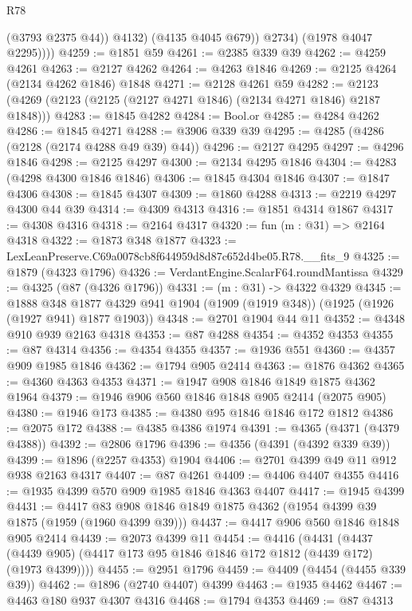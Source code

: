\begin{lexlean}{R78}
\begin{coremodule}
                  (@3793 @2375 @44))
                @4132)
              (@4135 @4045 @679))
            @2734)
          (@1978 @4047 @2295))))
@4259 := @1851 @59
@4261 := @2385 @339 @39
@4262 := @4259 @4261
@4263 := @2127 @4262
@4264 := @4263 @1846
@4269 := @2125 @4264 (@2134 @4262 @1846) @1848
@4271 := @2128 @4261 @59
@4282 := @2123 (@4269 (@2123 (@2125 (@2127 @4271 @1846) (@2134 @4271 @1846) @2187 @1848)))
@4283 := @1845 @4282
@4284 := Bool.or
@4285 := @4284 @4262
@4286 := @1845 @4271
@4288 := @3906 @339 @39
@4295 := @4285 (@4286 (@2128 (@2174 @4288 @49 @39) @44))
@4296 := @2127 @4295
@4297 := @4296 @1846
@4298 := @2125 @4297
@4300 := @2134 @4295 @1846
@4304 := @4283 (@4298 @4300 @1846 @1846)
@4306 := @1845 @4304 @1846
@4307 := @1847 @4306
@4308 := @1845 @4307
@4309 := @1860 @4288
@4313 := @2219 @4297 @4300 @44 @39
@4314 := @4309 @4313
@4316 := @1851 @4314 @1867
@4317 := @4308 @4316
@4318 := @2164 @4317
@4320 := fun (m : @31) => @2164 @4318
@4322 := @1873 @348 @1877
@4323 := LexLeanPreserve.C69a0078cb8f644959d8d87c652d4be05.R78.__fits_9
@4325 := @1879 (@4323 @1796)
@4326 := VerdantEngine.ScalarF64.roundMantissa
@4329 := @4325 (@87 (@4326 @1796))
@4331 := (m : @31) -> @4322 @4329
@4345 := @1888
    @348
    @1877
    @4329
    @941
    @1904
    (@1909 (@1919 @348))
    (@1925 (@1926 (@1927 @941) @1877 @1903))
@4348 := @2701 @1904 @44 @11
@4352 := @4348 @910 @939 @2163 @4318
@4353 := @87 @4288
@4354 := @4352 @4353
@4355 := @87 @4314
@4356 := @4354 @4355
@4357 := @1936 @551
@4360 := @4357 @909 @1985 @1846
@4362 := @1794 @905 @2414
@4363 := @1876 @4362
@4365 := @4360 @4363 @4353
@4371 := @1947 @908 @1846 @1849 @1875 @4362 @1964
@4379 := @1946 @906 @560 @1846 @1848 @905 @2414 (@2075 @905)
@4380 := @1946 @173
@4385 := @4380 @95 @1846 @1846 @172 @1812
@4386 := @2075 @172
@4388 := @4385 @4386 @1974
@4391 := @4365 (@4371 (@4379 @4388))
@4392 := @2806 @1796
@4396 := @4356 (@4391 (@4392 @339 @39))
@4399 := @1896 (@2257 @4353) @1904
@4406 := @2701 @4399 @49 @11 @912 @938 @2163 @4317
@4407 := @87 @4261
@4409 := @4406 @4407 @4355
@4416 := @1935 @4399 @570 @909 @1985 @1846 @4363 @4407
@4417 := @1945 @4399
@4431 := @4417 @83 @908 @1846 @1849 @1875 @4362 (@1954 @4399 @39 @1875 (@1959 (@1960 @4399 @39)))
@4437 := @4417 @906 @560 @1846 @1848 @905 @2414
@4439 := @2073 @4399 @11
@4454 := @4416
    (@4431 (@4437 (@4439 @905) (@4417 @173 @95 @1846 @1846 @172 @1812 (@4439 @172) (@1973 @4399))))
@4455 := @2951 @1796
@4459 := @4409 (@4454 (@4455 @339 @39))
@4462 := @1896 (@2740 @4407) @4399
@4463 := @1935 @4462
@4467 := @4463 @180 @937 @4307 @4316
@4468 := @1794 @4353
@4469 := @87 @4313

\end{coremodule}
\end{lexlean}
